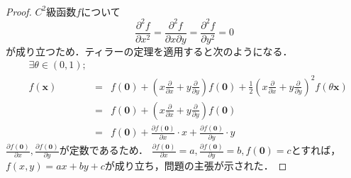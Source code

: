 \documentclass{jarticle}
\begin{document}
\\
\noindent 
{}
\begin{proof}
$C^2$級函数$f$について\\
$$
\frac{\partial^2 f}{\partial x^2} = \frac{\partial^2 f}{\partial x \partial y}=\frac{\partial^2 f}{\partial y^2}=0
$$
が成り立つため．ティラーの定理を適用すると次のようになる．\\
\begin{equation}
\begin{aligned}
&\exists \theta \in (0,1);\\
&f(\bm{x})&=&f(\bm{0})+(x\frac{\partial}{\partial x}+y\frac{\partial}{\partial y})f(\bm{0})+ \frac{1}{2}(x\frac{\partial}{\partial x}+y\frac{\partial}{\partial y})^2 f(\theta \bm{x})\\
&&=&f(\bm{0})+(x\frac{\partial}{\partial x}+y\frac{\partial}{\partial y})f(\bm{0})\\
&&=&f(\bm{0} ) + \frac{\partial f(\bm{0})}{\partial x}\cdot x+ \frac{\partial f(\bm{0})}{\partial y} \cdot y
\end{aligned}
\end{equation}
$\frac{\partial f(\bm{0})}{\partial x}, \frac{\partial f(\bm{0})}{\partial y}$が定数であるため．
$\frac{\partial f(\bm{0})}{\partial x}=a, \frac{\partial f(\bm{0})}{\partial y}=b,f(\bm{0})=c$とすれば，
$f(x,y)=ax+by+c$が成り立ち，問題の主張が示された．
\end{proof}
\end{document}
